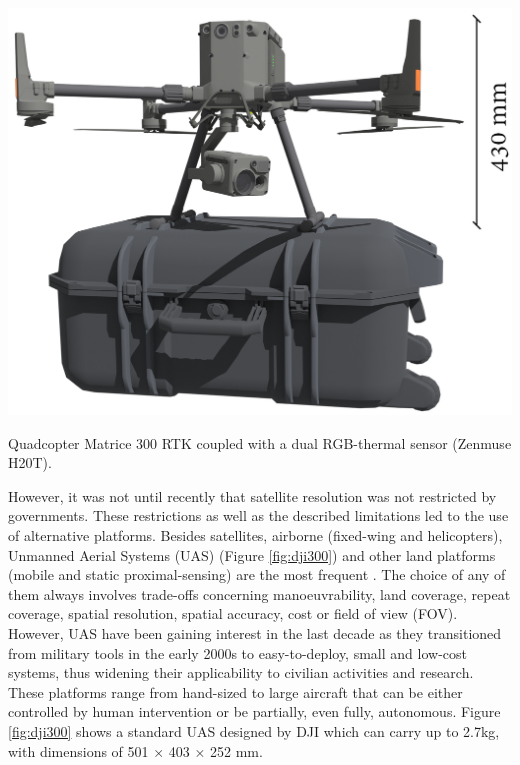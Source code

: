 \begin{marginfigure}[.7cm]
	\includegraphics{figs/introduction/dji300.png}
	\caption{Quadcopter Matrice 300 RTK coupled with a dual RGB-thermal sensor (Zenmuse H20T). }
	\label{fig:dji300}
\end{marginfigure}
However, it was not until recently that satellite resolution was not restricted by governments. These restrictions as well as the described limitations led to the use of alternative platforms. Besides satellites, airborne (fixed-wing and helicopters), Unmanned Aerial Systems (UAS) (Figure \ref{fig:dji300}) and other land platforms (mobile and static proximal-sensing) are the most frequent \cite{lillesand_remote_2015}. The choice of any of them always involves trade-offs concerning manoeuvrability, land coverage, repeat coverage, spatial resolution, spatial accuracy, cost or field of view (FOV). However, UAS have been gaining interest in the last decade as they transitioned from military tools in the early 2000s to easy-to-deploy, small and low-cost systems, thus widening their applicability to civilian activities and research. These platforms range from hand-sized to large aircraft that can be either controlled by human intervention or be partially, even fully, autonomous. Figure \ref{fig:dji300} shows a standard UAS designed by DJI which can carry up to 2.7\si{\kilo\gram}, with dimensions of 501 × 403 × 252 \si{\milli\meter}.


